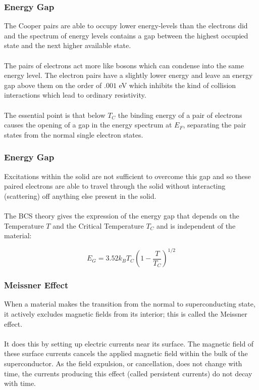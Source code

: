 \documentclass[10pt]{beamer}
\theoremstyle{definition}
\begin{document}
\begin{frame}
    \frametitle{Energy Gap}

    The Cooper pairs are able to occupy lower energy-levels than the 
    electrons did and the spectrum 
    of energy levels contains a gap between the highest occupied 
    state and the next higher available state.
    \\~\\

    The pairs of electrons act more like bosons which can condense into the same 
    energy level. The electron pairs have a slightly lower energy and leave an 
    energy gap above them on the order of $.001$ eV which inhibits the kind of
    collision interactions which lead to ordinary resistivity.
    \\~\\

    The essential point is that below $T_C$ the binding energy of a pair of
    electrons causes the opening of a gap in the energy spectrum at $E_F$, 
    separating the pair states from the normal single electron states.


\end{frame}

\begin{frame}
    \frametitle{Energy Gap}

    Excitations within the solid are not sufficient to overcome this gap 
    and so these paired electrons are able to travel through the solid 
    without interacting (scattering) off anything else present in the solid.
    \\~\\

    The BCS theory gives the expression of the energy gap that depends on 
    the Temperature $T$ and the Critical Temperature $T_C$ and is 
    independent of the material:

    \begin{equation}
        E_G = 3.52k_B T_C \left( 1-\frac{T}{T_{C}} \right)^{1/2}
    \end{equation}



\end{frame}


\begin{frame}
    \frametitle{Meissner Effect}

    When a material makes the transition from the normal to superconducting 
    state, it actively excludes magnetic fields from its interior; 
    this is called the Meissner effect.
    \\~\\
    It does this by setting up electric currents near its surface. 
    The magnetic field of these surface currents cancels the applied 
    magnetic field within the bulk of the superconductor. As the field 
    expulsion, or cancellation, does not change with time, the currents 
    producing this effect (called persistent currents) do not decay 
    with time.


\end{frame}
\end{document}
